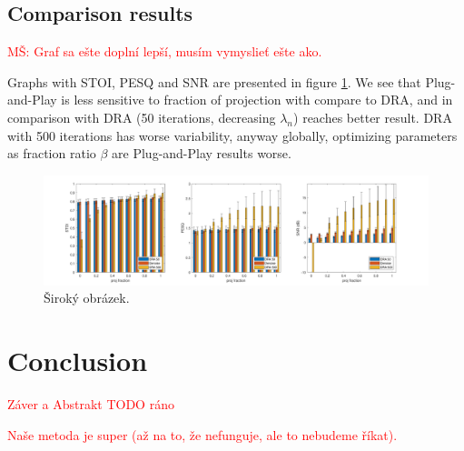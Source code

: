 \documentclass[conference]{IEEEtran}
\newcommand{\todo}[1]{\textcolor{red}{#1}}
\begin{document}
\subsection{Comparison results}



\todo{MŠ: Graf sa ešte doplní lepší, musím vymyslieť ešte ako.}



Graphs with STOI, PESQ and SNR are presented in figure \ref{fig:final2witherrors}.
We see that Plug-and-Play is less sensitive to fraction of projection with compare to DRA,
and in comparison with DRA (50 iterations, decreasing $\lambda_n$) reaches better result.
DRA with 500 iterations has worse variability, anyway globally, optimizing parameters as fraction ratio $\beta$ are Plug-and-Play results worse.



\begin{figure}
	\includegraphics[width=\linewidth]{figures/final2_with_errors}
	\caption{Široký obrázek.}
	\label{fig:final2witherrors}
\end{figure}

\section{Conclusion}
\label{sec:conclusion}

\todo{Záver a Abstrakt TODO ráno}

\todo{Naše metoda je super (až na to, že nefunguje, ale to nebudeme říkat).}
\end{document}
